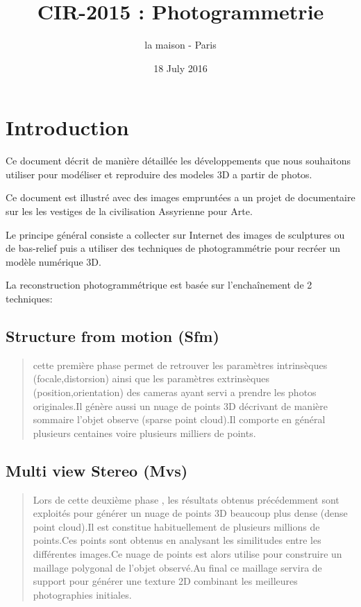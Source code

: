 \documentclass[a4paper,10pt,french]{sphinxhowto}
\title{CIR-2015 : Photogrammetrie}
\date{18 July 2016}
\author{la maison - Paris}
\begin{document}
\maketitle
\tableofcontents
{}\label{index::doc}



\section{Introduction}
\label{introduction:introduction}\label{introduction:les-dernieres-pierres-de-mesopotamie}\label{introduction::doc}
{\hfill{}\hfill}

Ce document décrit de manière détaillée les développements que nous souhaitons utiliser pour modéliser et reproduire des modeles 3D a partir de photos.

Ce document est illustré avec des images empruntées a un projet de documentaire sur les les vestiges de la civilisation Assyrienne pour Arte.

Le principe général consiste a collecter sur Internet des images de sculptures ou de bas-relief puis a utiliser des techniques de photogrammétrie pour recréer un modèle numérique 3D.

La reconstruction photogrammétrique est basée sur l’enchaînement de 2 techniques:


\subsection{\textbf{Structure from motion (Sfm)}}
\label{introduction:structure-from-motion-sfm}\begin{quote}

cette première phase permet de retrouver les paramètres intrinsèques (focale,distorsion) ainsi que les paramètres extrinsèques (position,orientation) des cameras ayant servi a prendre les photos originales.Il génère aussi un nuage de points 3D décrivant de manière sommaire l'objet observe (sparse point cloud).Il comporte en général plusieurs centaines voire plusieurs milliers de points.
\end{quote}


\subsection{\textbf{Multi view Stereo (Mvs)}}
\label{introduction:multi-view-stereo-mvs}\begin{quote}

Lors de cette deuxième phase , les résultats obtenus précédemment sont exploités pour générer un nuage de points 3D beaucoup plus dense (dense point cloud).Il est constitue habituellement de plusieurs millions de points.Ces points sont obtenus en analysant les similitudes entre les différentes images.Ce nuage de points est alors utilise pour construire un maillage polygonal de l'objet observé.Au final ce maillage servira de support pour générer une texture 2D combinant les meilleures photographies initiales.
\end{quote}
\end{document}
